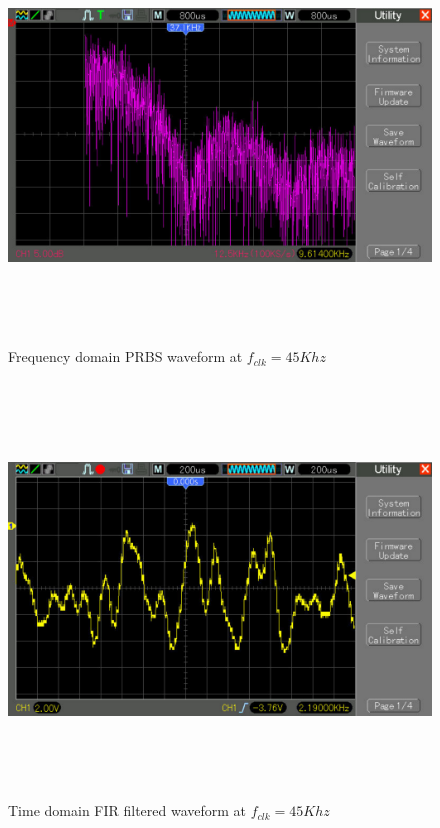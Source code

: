 \documentclass[a4paper,12pt]{article}
\begin{document}
\begin{figure}[!ht]
	\centering
	\includegraphics[width=\linewidth,height=11cm]{pic_489_1.pdf}
	\caption{Frequency domain PRBS waveform at $f_{clk} = 45Khz$}
		\label{fig:result-4}
\end{figure}

\begin{figure}[!ht]
	\centering
	\includegraphics[width=\linewidth,height=11cm]{pic_488_1.pdf}
	\caption{Time domain FIR filtered waveform at $f_{clk} = 45Khz$}
	\label{fig:result-1}	
\end{figure}
\end{document}
